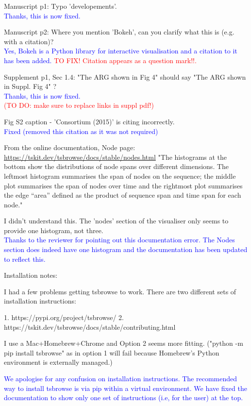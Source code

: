 \documentclass{letter}
\begin{document}
\begin{letter}{}
Manuscript p1: Typo 'developements'.\\
\textcolor{blue}{Thanks, this is now fixed.}

Manuscript p2: Where you mention 'Bokeh', can you clarify what this is (e.g. with a citation)?\\
\textcolor{blue}{Yes, Bokeh is a Python library for interactive visualisation and a citation to it 
has been added.}
\textcolor{red}{TO FIX! Citation appears as a question mark!!.}

Supplement p1, Sec 1.4: "The ARG shown in Fig 4" should say "The ARG shown in Suppl. Fig 4" ?\\
\textcolor{blue}{Thanks, this is now fixed.}\\
\textcolor{red}{(TO DO: make sure to replace links in suppl pdf!)}

Fig S2 caption - 'Consortium (2015)' is citing incorrectly.\\
\textcolor{blue}{Fixed (removed this citation as it was not required)}

From the online documentation, Node page: \url{https://tskit.dev/tsbrowse/docs/stable/nodes.html}
"The histograms at the bottom show the distributions of node spans over different dimensions. 
The leftmost histogram summarises the span of nodes on the sequence; the middle plot summarises 
the span of nodes over time and the rightmost plot summarises the edge “area” defined as the product 
of sequence span and time span for each node."

I didn't understand this. The 'nodes' section of the visualiser only seems to provide one histogram, 
not three.\\

\textcolor{blue}{Thanks to the reviewer for pointing out this documentation error. The Nodes section 
does indeed have one histogram and the documentation has been updated to reflect this.}

Installation notes:

I had a few problems getting tsbrowse to work. There are two different sets of installation instructions:

1. https://pypi.org/project/tsbrowse/
2. https://tskit.dev/tsbrowse/docs/stable/contributing.html

I use a Mac+Homebrew+Chrome and Option 2 seems more fitting. ("python -m pip install tsbrowse" as in 
option 1 will fail because Homebrew's Python environment is externally managed.)

\textcolor{blue}{We apologise for any confusion on installation instructions. The recommended way to install 
tsbrowse is via pip within a virtual environment. We have fixed the documentation to show only one set of 
instructions (i.e, for the user) at the top.}


\end{letter}
\end{document}
